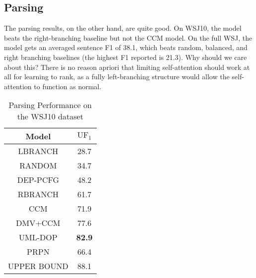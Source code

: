 \documentclass{article}
\begin{document}
\subsection{Parsing}
The parsing results, on the other hand, are quite good.
On WSJ10, the model beats the right-branching baseline but not the CCM model.
On the full WSJ, the model gets an averaged sentence F1 of 38.1,
which beats random, balanced, and right branching baselines
(the highest F1 reported is 21.3).
Why should we care about this?
There is no reason apriori that limiting self-attention should work at all
for learning to rank, as a fully left-branching structure would
allow the self-attention to function as normal. 

\begin{table}[h!]                                    
\centering
  \begin{tabular}{ c c }
    \toprule[2pt]
    Model & $\mathrm{UF}_1$ \\
    \hline
    LBRANCH &  28.7 \\
    RANDOM & 34.7 \\
    DEP-PCFG \citep{carroll1992two} & 48.2 \\
    RBRANCH & 61.7 \\
    CCM \citep{klein2002generative} & 71.9 \\
    DMV+CCM \citep{klein2005natural} & 77.6 \\
    UML-DOP \citep{bod2006all} & \textbf{82.9} \\
    \hline
    PRPN & 66.4 \\
    \hline                                          
    UPPER BOUND & 88.1 \\                           
    \toprule[2pt]                                   
  \end{tabular}                                     
  \caption{Parsing Performance on the WSJ10 dataset}
  \label{tb_parser}                                 
\end{table}                                         
\end{document}
